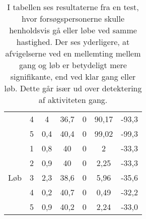 \begin{table}[H]
{\begin{tabular}{ccccccc}
		& 4             & 4                                                                                                & 36,7                                                                                              & 0      & 90,17& -93,3                                                                                               \\
		& 5             & 0,4                                                                                                & 40,4                                                                                                & 0      & 99,02 & -99,3                                                                                              \\ \hline
		\multirow{5}{*}{Løb}                                                      & 1                                                                                                          & 0,8 & 40                                                                                             & 0     & 2   & -33,3                                                                                             \\
		& 2                                                                                           & 0,9  & 40                                                                                            & 0         & 2,25 & -33,3                                                                                           \\
		& 3                                                                                              & 2,3    & 38,6                                                                                            & 0      & 5,96 & -35,6                                                                                              \\
		& 4                                                                                                      & 0,2  & 40,7                                                                                            & 0     & 0,49   & -32,2                                                                                             \\
		& 5                                                                                                    & 0,9     & 40,2                                                                                           & 0         & 2,24 & -33,0  \\ \hline 
		\end{tabular}
	}
	\caption{I tabellen ses resultaterne fra en test, hvor forsøgspersonerne skulle henholdsvis gå eller løbe ved samme hastighed. Der ses yderligere, at afvigelserne ved en mellemting mellem gang og løb er betydeligt mere signifikante, end ved klar gang eller løb. Dette går især ud over detektering af aktiviteten gang.}
	\label{tab:samletsys_8kmt}
\end{table}\vspace{-.5cm}

